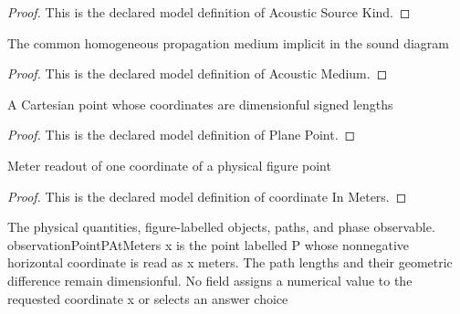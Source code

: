 \begin{proof}
  This is the declared model definition of Acoustic Source Kind.
\end{proof}
\begin{definition}
  \label{def:physics:phyx-mini-0316:phyxminiproblems-problemphyxmini0316-acousticmedium}
  The common homogeneous propagation medium implicit in the sound diagram
\end{definition}
\begin{proof}
  This is the declared model definition of Acoustic Medium.
\end{proof}
\begin{definition}
  \label{def:physics:phyx-mini-0316:phyxminiproblems-problemphyxmini0316-planepoint}
  A Cartesian point whose coordinates are dimensionful signed lengths
\end{definition}
\begin{proof}
  This is the declared model definition of Plane Point.
\end{proof}
\begin{definition}
  \label{def:physics:phyx-mini-0316:phyxminiproblems-problemphyxmini0316-coordinateinmeters}
  Meter readout of one coordinate of a physical figure point
\end{definition}
\begin{proof}
  This is the declared model definition of coordinate In Meters.
\end{proof}
\begin{definition}
  \label{def:physics:phyx-mini-0316:phyxminiproblems-problemphyxmini0316-twopointsourceinterferencesetup}
  The physical quantities, figure-labelled objects, paths, and phase observable. observationPointPAtMeters x is the point labelled P whose nonnegative horizontal coordinate is read as x meters. The path lengths and their geometric difference remain dimensionful. No field assigns a numerical value to the requested coordinate x or selects an answer choice
\end{definition}
